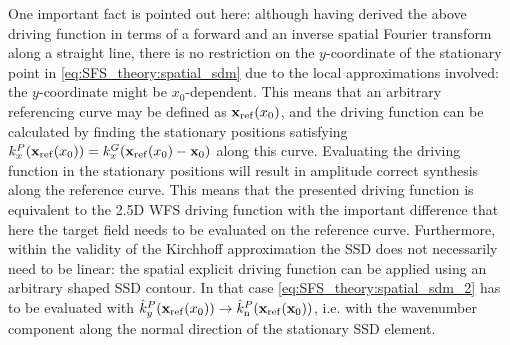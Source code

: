 One important fact is pointed out here: although having derived the above driving function in terms of a forward and an inverse spatial Fourier transform along a straight line, there is no restriction on the $y$-coordinate of the stationary point in \eqref{eq:SFS_theory:spatial_sdm} due to the local approximations involved: the $y$-coordinate might be $x_0$-dependent.
This means that an arbitrary referencing curve may be defined as $\mathbf{x}_{\mathrm{ref}}(x_0)$, and the driving function can be calculated by finding the stationary positions 
satisfying $k_x^P(\mathbf{x}_{\mathrm{ref}}(x_0)) = k_x^G(\mathbf{x}_{\mathrm{ref}}(x_0) - \mathbf{x}_0)$ along this curve.
Evaluating the driving function in the stationary positions will result in amplitude correct synthesis along the reference curve. 
This means that the presented driving function is equivalent to the 2.5D WFS driving function with the important difference that here the target field needs to be evaluated on the reference curve.
Furthermore, within the validity of the Kirchhoff approximation the SSD does not necessarily need to be linear: the spatial explicit driving function can be applied using an arbitrary shaped SSD contour.
In that case \eqref{eq:SFS_theory:spatial_sdm_2} has to be evaluated with $\hat{k}_y^{P}(\mathbf{x}_{\mathrm{ref}}(x_0)) \rightarrow \hat{k}_{\mathrm{n}}^{P}(\mathbf{x}_{\mathrm{ref}}(\mathbf{x}_0))$, i.e. with the wavenumber component along the normal direction of the stationary SSD element.

